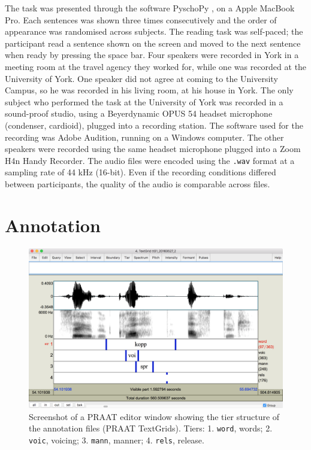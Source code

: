 \documentclass[11pt,a4paper,openany]{memoir}\usepackage[]{graphicx}\usepackage[]{color}
\begin{document}
The task was presented through the software PyschoPy \citep{peirce2009}, on a Apple MacBook Pro.
Each sentences was shown three times consecutively and the order of appearance was randomised across subjects.
The reading task was self-paced; the participant read a sentence shown on the screen and moved to the next sentence when ready by pressing the space bar.
Four speakers were recorded in York in a meeting room at the travel agency they worked for, while one was recorded at the University of York.
One speaker did not agree at coming to the University Campus, so he was recorded in his living room, at his house in York.
The only subject who performed the task at the University of York was recorded in a sound-proof studio, using a Beyerdynamic OPUS 54 headset microphone (condenser, cardioid), plugged into a recording station.
The software used for the recording was Adobe Audition, running on a Windows computer.
The other speakers were recorded using the same headset microphone plugged into a Zoom H4n Handy Recorder.
The audio files were encoded using the \texttt{.wav} format at a sampling rate of 44 kHz (16-bit).
Even if the recording conditions differed between participants, the quality of the audio is comparable across files.

\section{Annotation}
\label{s:annotation}

\begin{figure}
\centering
\includegraphics[width=\textwidth]{textgrid}
\caption[Structure of annotation files]{Screenshot of a PRAAT editor window showing the tier structure of the annotation files (PRAAT TextGrids). Tiers: 1. \texttt{word}, words; 2. \texttt{voic}, voicing; 3. \texttt{mann}, manner; 4. \texttt{rels}, release.}
\label{f:textgrid}
\end{figure}
\end{document}
